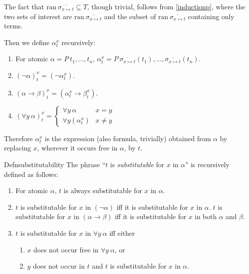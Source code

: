 The fact that $\mathrm{ran}\ \overline{\sigma_{x\mapsto t}}\subseteq T$, though trivial, follows from \ref{inductionp}, where the two sets of interest are $\mathrm{ran}\ \overline{\sigma_{x\mapsto t}}$ and the subset of $\mathrm{ran}\ \overline{\sigma_{x\mapsto t}}$ containing only terms.

Then we define $\alpha_t^x$ recursively:
\begin{enumerate}
  \item For atomic $\alpha=P\ t_1,\dots,t_n$, $\alpha_t^x=P\ \overline{\sigma_{x\mapsto t}}(t_1),\dots,\overline{\sigma_{x\mapsto t}}(t_n)$.
  \item $(\neg \alpha)_t^x=(\neg \alpha_t^x)$.
  \item $(\alpha\rightarrow \beta)_t^x=(\alpha_t^x\rightarrow \beta_t^x).$
  \item $(\forall y\ \alpha)_t^x=\begin{cases}
            \forall y\ \alpha     & x=y     \\
            \forall y(\alpha_t^x) & x\neq y
          \end{cases}$
\end{enumerate}
Therefore $\alpha_t^x$ is the expression (also formula, trivially) obtained from $\alpha$ by replacing $x$, wherever it occurs free in $\alpha$, by $t$.

\begin{reference}{Defn}{substitutability}
  The phrase ``$t$ is \textit{substitutable} for $x$ in $\alpha$'' is recursively defined as follows:
  \begin{enumerate}
    \item For atomic $\alpha$, $t$ is always substitutable for $x$ in $\alpha$.
    \item $t$ is substitutable for $x$ in $(\neg \alpha)$ iff it is substitutable for $x$ in $\alpha$. $t$ is substitutable for $x$ in $(\alpha\rightarrow \beta)$ iff it is substitutable for $x$ in both $\alpha$ and $\beta$.
    \item $t$ is substitutable for $x$ in $\forall y\ \alpha$ iff either
          \begin{enumerate}
            \item $x$ does not occur free in $\forall y\ \alpha$, or
            \item $y$ does not occur in $t$ and $t$ is substitutable for $x$ in $\alpha$.\qedhere
          \end{enumerate}
  \end{enumerate}
\end{reference}

